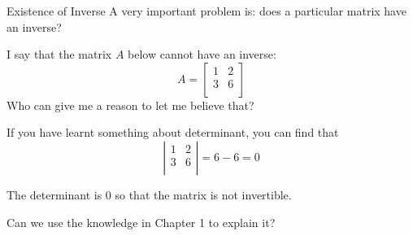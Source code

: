 \documentclass{beamer}
\begin{document}
\begin{frame}{Existence of Inverse}
A very important problem is: does a particular matrix have an inverse?

\vspace{3pt}
I say that the matrix $A$ below cannot have an inverse:
\begin{equation*}
    A=\left[ \begin{matrix}
        1&		2\\
        3&		6\\
    \end{matrix} \right]
\end{equation*}
Who can give me a reason to let me believe that?

If you have learnt something about determinant, you can find that
\begin{equation*}
    \left| \begin{matrix}
        1&		2\\
        3&		6\\
    \end{matrix} \right|=6-6=0
\end{equation*}

The determinant is 0 so that the matrix is not invertible.

\vspace{3pt}
Can we use the knowledge in Chapter 1 to explain it?
\end{frame}
\end{document}
